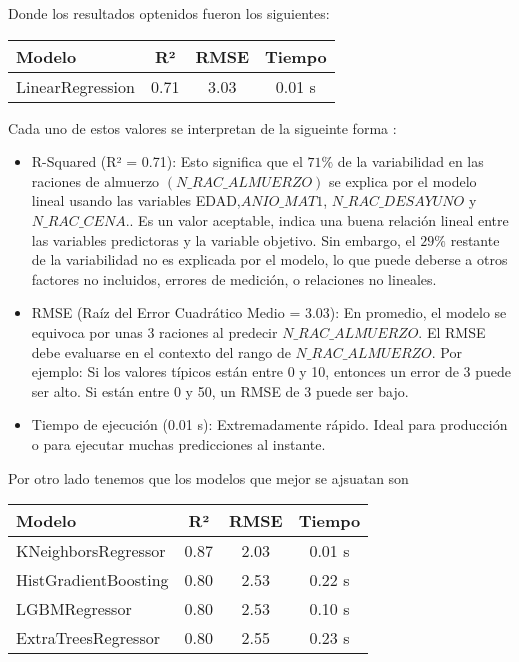 \documentclass{article}
\begin{document}
Donde los resultados optenidos fueron los siguientes:

\begin{tcolorbox}[colback=gray!5, colframe=black, title=Resultados de Modelos]
\begin{tabular}{lccc}
\toprule
\textbf{Modelo} & \textbf{R²} & \textbf{RMSE} & \textbf{Tiempo} \\
\midrule
LinearRegression     & 0.71 & 3.03 & 0.01 s \\

\bottomrule
\end{tabular}
\end{tcolorbox}

Cada uno de estos valores se interpretan de la sigueinte forma :
\begin{itemize}
    \item R-Squared (R² = 0.71):
    Esto significa que el $ 71\%$ de la variabilidad en las raciones de almuerzo $(N\_RAC\_ALMUERZO)$ se explica por el modelo lineal usando las variables EDAD,$ ANIO\_MAT1$, $N\_RAC\_DESAYUNO$ y $N\_RAC\_CENA.$. Es un valor aceptable, indica una buena relación lineal entre las variables predictoras y la variable objetivo. Sin embargo, el $29\%$ restante de la variabilidad no es explicada por el modelo, lo que puede deberse a otros factores no incluidos, errores de medición, o relaciones no lineales.

    \item RMSE (Raíz del Error Cuadrático Medio = 3.03): En promedio, el modelo se equivoca por unas 3 raciones al predecir $N\_RAC\_ALMUERZO$. El RMSE debe evaluarse en el contexto del rango de $N\_RAC\_ALMUERZO$. Por ejemplo: Si los valores típicos están entre 0 y 10, entonces un error de 3 puede ser alto. Si están entre 0 y 50, un RMSE de 3 puede ser bajo.
    \item Tiempo de ejecución (0.01 s): Extremadamente rápido. Ideal para producción o para ejecutar muchas predicciones al instante.
  
\end{itemize}
Por otro lado tenemos que los modelos que mejor se ajsuatan son 

\begin{tcolorbox}[colback=gray!5, colframe=black, title=Resultados de Modelos]
\begin{tabular}{lccc}
\toprule
\textbf{Modelo} & \textbf{R²} & \textbf{RMSE} & \textbf{Tiempo} \\
\midrule
KNeighborsRegressor     & 0.87 & 2.03 & 0.01 s \\
HistGradientBoosting    & 0.80 & 2.53 & 0.22 s \\
LGBMRegressor           & 0.80 & 2.53 & 0.10 s \\
ExtraTreesRegressor     & 0.80 & 2.55 & 0.23 s \\
\bottomrule
\end{tabular}
\end{tcolorbox}
\end{document}
